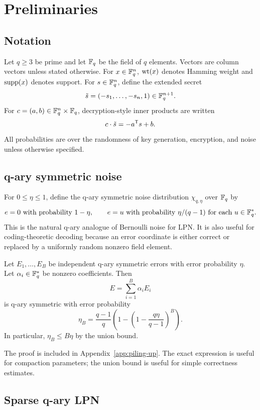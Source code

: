 \section{Preliminaries}

\subsection{Notation}

Let $q\ge 3$ be prime and let $\mathbb{F}_q$ be the field of $q$ elements.  Vectors are column vectors unless stated otherwise.  For $x\in\mathbb{F}_q^n$, $\operatorname{wt}(x)$ denotes Hamming weight and $\operatorname{supp}(x)$ denotes support.  For $s\in\mathbb{F}_q^n$, define the extended secret
\[
    \tilde{s}=(-s_1,\ldots,-s_n,1)\in\mathbb{F}_q^{n+1}.
\]
For $c=(a,b)\in\mathbb{F}_q^n\times\mathbb{F}_q$, decryption-style inner products are written
\[
    c\cdot \tilde{s}=-a^{\mathsf T} s+b.
\]
All probabilities are over the randomness of key generation, encryption, and noise unless otherwise specified.

\subsection{q-ary symmetric noise}

For $0\le \eta\le 1$, define the q-ary symmetric noise distribution $\chi_{q,\eta}$ over $\mathbb{F}_q$ by
\[
    e=0 \text{ with probability }1-\eta,
    \qquad
    e=u \text{ with probability }\eta/(q-1)\text{ for each }u\in\mathbb{F}_q^*.
\]
This is the natural q-ary analogue of Bernoulli noise for LPN.  It is also useful for coding-theoretic decoding because an error coordinate is either correct or replaced by a uniformly random nonzero field element.

\begin{lemma}
\label{lem:qary-piling}
Let $E_1,\ldots,E_B$ be independent q-ary symmetric errors with error probability $\eta$.  Let $\alpha_i\in\mathbb{F}_q^*$ be nonzero coefficients.  Then
\[
    E=\sum_{i=1}^B \alpha_iE_i
\]
is q-ary symmetric with error probability
\[
    \eta_B=\frac{q-1}{q}\left(1-\left(1-\frac{q\eta}{q-1}\right)^B\right).
\]
In particular, $\eta_B\le B\eta$ by the union bound.
\end{lemma}

\noindent The proof is included in Appendix~\ref{app:piling-up}.  The exact expression is useful for compaction parameters; the union bound is useful for simple correctness estimates.

\subsection{Sparse q-ary LPN}

